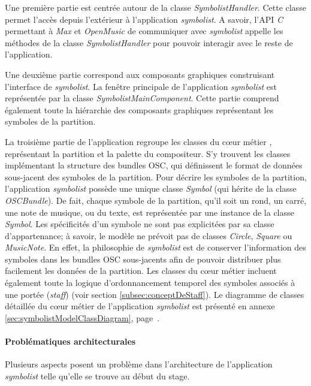 Une première partie est centrée autour de la classe \textit{SymbolistHandler}. Cette classe permet l'accès depuis l'extérieur à l'application \textit{symbolist}. A savoir, l'API \textit{C} permettant à \textit{Max} et \textit{OpenMusic} de communiquer avec \textit{symbolist} appelle les méthodes de la classe \textit{SymbolistHandler} pour pouvoir interagir avec le reste de l'application.

Une deuxième partie correspond aux composants graphiques construisant l'interface de \textit{symbolist}. La fenêtre principale de l'application \textit{symbolist} est représentée par la classe \textit{SymbolistMainComponent}. Cette partie comprend également toute la hiérarchie des composants graphiques représentant les symboles de la partition.

La troisième partie de l'application regroupe les classes du \og cœur métier \fg, représentant la partition et la palette du compositeur. 
S'y trouvent les classes implémentant la structure des bundles OSC, qui définissent le format de données sous-jacent des symboles de la partition.
Pour décrire les symboles de la partition, l'application \textit{symbolist} possède une unique classe \textit{Symbol} (qui hérite de la classe \textit{OSCBundle}). De fait, chaque symbole de la partition, qu'il soit un rond, un carré, une note de musique, ou du texte, est représentée par une instance de la classe \textit{Symbol}. Les spécificités d'un symbole ne sont pas explicitées par sa classe d'appartenance; 
à savoir, le modèle ne prévoit pas de classes \textit{Circle}, \textit{Square} ou \textit{MusicNote}.
En effet, la philosophie de \textit{symbolist} est de conserver l'information des symboles dans les bundles OSC sous-jacents afin de pouvoir distribuer plus facilement les données de la partition.
Les classes du cœur métier incluent également toute la logique d'ordonnancement temporel des symboles associés à une portée (\textit{staff}) (voir section \ref{subsec:conceptDeStaff}).
Le diagramme de classes détaillée du cœur métier de l'application \textit{symbolist} est présenté en annexe \ref{sec:symbolistModelClassDiagram}, page~\pageref{sec:symbolistModelClassDiagram}.

\paragraph{Problématiques architecturales} Plusieurs aspects posent un problème dans l'architecture de l'application \textit{symbolist} telle qu'elle se trouve au début du stage.


